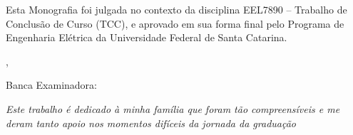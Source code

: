\documentclass[a5paper,english,spanish,brazil]{ufsc-thesis}
\begin{document}
	\begin{folhadeaprovacao}

	  \begin{center}
	    {\imprimirautor}

	    \vspace*{\fill}\vspace*{\fill}
	    \begin{center}
	      \ABNTEXchapterfont\bfseries\Large\imprimirtitulo
	    \end{center}
	    \vspace*{\fill}
	    
	    
	    	\begin{center}
	    		\vspace*{0.5cm}
	    		Esta Monografia foi julgada no contexto da disciplina EEL7890 -- Trabalho de Conclusão de Curso (TCC), e aprovado em sua forma final pelo Programa de Engenharia Elétrica da Universidade Federal de Santa Catarina.
	    		\vspace*{0.5cm}
	  		\end{center}
	    
	    \vspace*{\fill}
	   \end{center}
	  
	  \begin{center}
	    {\large\imprimirlocal},
	    {\large\imprimirdata}
	  \end{center}
	        
	   Banca Examinadora:
	      

	\end{folhadeaprovacao}

	\begin{dedicatoria}
	   \vspace*{\fill}
	   \centering
	   \noindent
	   \textit{Este trabalho é dedicado à minha família que foram tão compreensíveis e me deram tanto apoio nos momentos difíceis da jornada da graduação} \vspace*{\fill}
	\end{dedicatoria}
\end{document}
